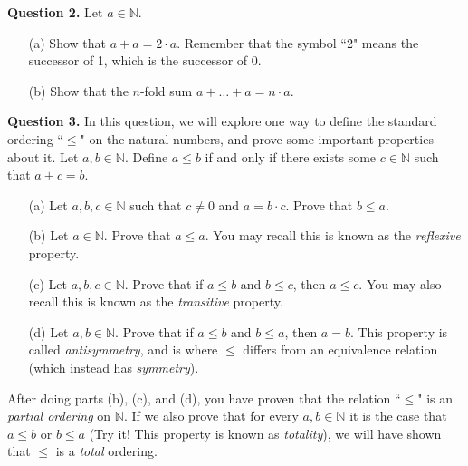 \documentclass[10pt]{report}
\begin{document}
\bigskip
 


\noindent\textbf{Question 2.}  Let $a \in \mathbb{N}$.   

\begin{itemize}

\item[(a)] Show that $a+a = 2\cdot a$. Remember that the symbol ``2" means the successor of 1, which is the successor of 0. 

\item[(b)] Show that the $n$-fold sum $a + \ldots + a = n\cdot a$.  

\end{itemize}

\bigskip

\noindent\textbf{Question 3.}  In this question, we will explore one way to define the standard ordering ``$\leq$" on the natural numbers, and prove some important properties about it.  Let $a, b \in \mathbb{N}$.  Define $a \leq b$ if and only if there exists some $c \in \mathbb{N}$ such that $a+c = b$. 

\begin{itemize}

\item[(a)] Let $a, b, c \in \mathbb{N}$ such that $c \neq 0$ and $a = b\cdot c$. Prove that $b\leq a$. 

\item[(b)] Let $a \in \mathbb{N}$. Prove that $a \leq a$. You may recall this is known as the \textit{reflexive} property. 

\item[(c)] Let $a, b, c \in \mathbb{N}$. Prove that if $a \leq b$ and $b \leq c$, then $a \leq c$. You may also recall this is known as the \textit{transitive} property. 

\item[(d)] Let $a, b \in \mathbb{N}$. Prove that if $a \leq b$ and $b \leq a$, then $a = b$. This property is called \textit{antisymmetry}, and is where $\leq$ differs from an equivalence relation (which instead has \textit{symmetry}). 

\end{itemize}

\noindent After doing parts (b), (c), and (d), you have proven that the relation ``$\leq$" is an \textit{partial ordering} on $\mathbb{N}$. If we also prove that for every $a, b \in \mathbb{N}$ it is the case that $a \leq b$ or $b\leq a$ (Try it! This property is known as \textit{totality}), we will have shown that $\leq$ is a \textit{total} ordering. 
\end{document}
